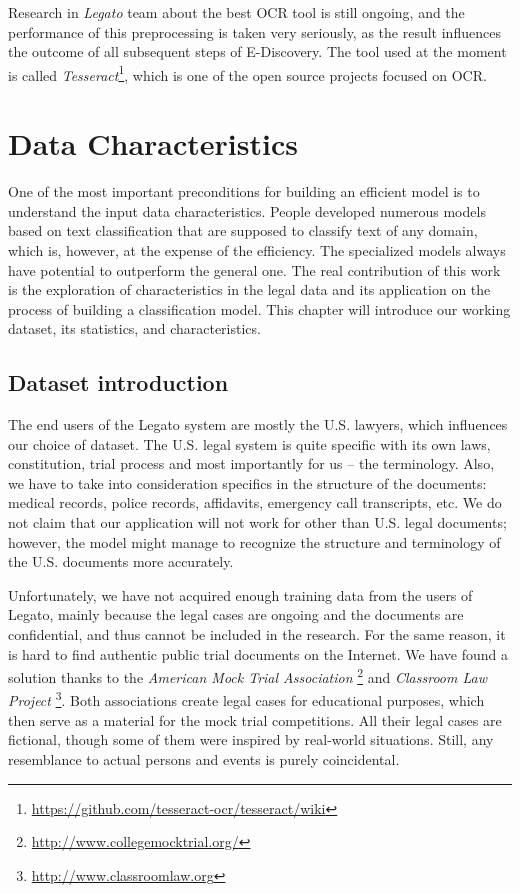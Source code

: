\documentclass[
  digital, %
  notable,   %
  nolof,     %
  nolot,     %
]{fithesis3}
\begin{document}
Research in \textit{Legato} team about the best OCR tool is still ongoing, and the performance of this preprocessing is taken very seriously, as the result influences the outcome of all subsequent steps of E-Discovery. The tool used at the moment is called \textit{Tesseract}\footnote{\url{https://github.com/tesseract-ocr/tesseract/wiki}}, which is one of the open source projects focused on OCR.

\chapter{Data Characteristics}
\label{chp:data_characteristics}
One of the most important preconditions for building an efficient model is to understand the input data characteristics.
People developed numerous models based on text classification that are supposed to classify text of any domain, which is, however, at the expense of the efficiency.
The specialized models always have potential to outperform the general one.
The real contribution of this work is the exploration of characteristics in the legal data and its application on the process of building a classification model.
This chapter will introduce our working dataset, its statistics, and characteristics.

\section{Dataset introduction}
The end users of the Legato system are mostly the U.S. lawyers, which influences our choice of dataset.
The U.S. legal system is quite specific with its own laws, constitution, trial process and most importantly for us -- the terminology.
Also, we have to take into consideration specifics in the structure of the documents: medical records, police records, affidavits, emergency call transcripts, etc.
We do not claim that our application will not work for other than U.S. legal documents; however, the model might manage to recognize the structure and terminology of the U.S. documents more accurately.

Unfortunately, we have not acquired enough training data from the users of Legato, mainly because the legal cases are ongoing and the documents are confidential, and thus cannot be included in the research.
For the same reason, it is hard to find authentic public trial documents on the Internet.
We have found a solution thanks to the \textit{American Mock Trial Association} \footnote{\url{http://www.collegemocktrial.org/}} and \textit{Classroom Law Project} \footnote{\url{http://www.classroomlaw.org}}.
Both associations create legal cases for educational purposes, which then serve as a material for the mock trial competitions.
All their legal cases are fictional, though some of them were inspired by real-world situations.
Still, any resemblance to actual persons and events is purely coincidental.
\end{document}
